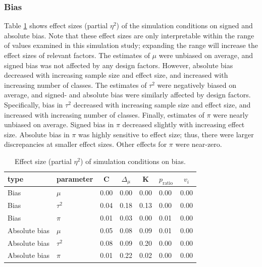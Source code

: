 \documentclass[
  english,
  man, noextraspace,floatsintext]{apa6}
\begin{document}
\subsubsection{Bias}\label{bias}

Table \ref{tab:tabesbias} shows effect sizes (partial \(\eta^2\)) of the simulation conditions on signed and absolute bias.
Note that these effect sizes are only interpretable within the range of values examined in this simulation study; expanding the range will increase the effect sizes of relevant factors.
The estimates of \(\mu\) were unbiased on average, and signed bias was not affected by any design factors.
However, absolute bias decreased with increasing sample size and effect size, and increased with increasing number of classes.
The estimates of \(\tau^2\) were negatively biased on average, and signed- and absolute bias were similarly affected by design factors.
Specifically, bias in \(\tau^2\) decreased with increasing sample size and effect size, and increased with increasing number of classes.
Finally, estimates of \(\pi\) were nearly unbiased on average.
Signed bias in \(\pi\) decreased slightly with increasing effect size.
Absolute bias in \(\pi\) was highly sensitive to effect size; thus, there were larger discrepancies at smaller effect sizes.
Other effects for \(\pi\) were near-zero.

\begin{table}[tbp]

\begin{center}
\begin{threeparttable}

\caption{\label{tab:tabesbias}Effect size (partial $\eta^2$) of simulation conditions on bias.}

\begin{tabular}{lllllll}
\toprule
type & \multicolumn{1}{c}{parameter} & \multicolumn{1}{c}{C} & \multicolumn{1}{c}{$\Delta_{\mu}$} & \multicolumn{1}{c}{K} & \multicolumn{1}{c}{$p_{\text{ratio}}$} & \multicolumn{1}{c}{$v_i$}\\
\midrule
Bias & $\mu$ & 0.00 & 0.00 & 0.00 & 0.00 & 0.00\\
Bias & $\tau^2$ & 0.04 & 0.18 & 0.13 & 0.00 & 0.00\\
Bias & $\pi$ & 0.01 & 0.03 & 0.00 & 0.01 & 0.00\\
Absolute bias & $\mu$ & 0.05 & 0.08 & 0.09 & 0.01 & 0.00\\
Absolute bias & $\tau^2$ & 0.08 & 0.09 & 0.20 & 0.00 & 0.00\\
Absolute bias & $\pi$ & 0.01 & 0.22 & 0.02 & 0.00 & 0.00\\
\bottomrule
\end{tabular}

\end{threeparttable}
\end{center}

\end{table}
\end{document}
